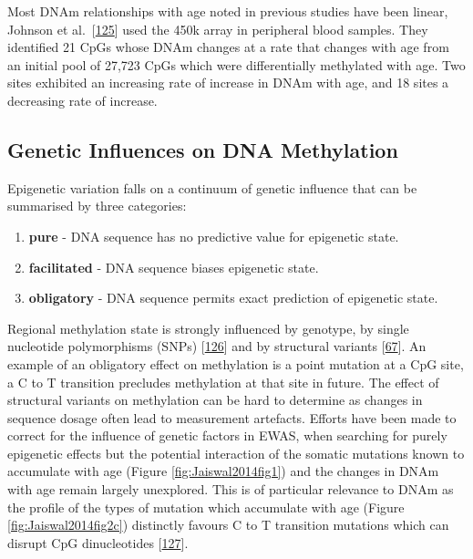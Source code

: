 \documentclass[
]{book}
\begin{document}
Most DNAm relationships with age noted in previous studies have been linear, Johnson et al.~{[}\protect\hyperlink{ref-Johnson2017}{125}{]} used the 450k array in peripheral blood samples.
They identified 21 CpGs whose DNAm changes at a rate that changes with age from an initial pool of 27,723 CpGs which were differentially methylated with age.
Two sites exhibited an increasing rate of increase in DNAm with age, and 18 sites a decreasing rate of increase.

\hypertarget{genetic-influences-on-dna-methylation}{%
\subsection{Genetic Influences on DNA Methylation}\label{genetic-influences-on-dna-methylation}}

Epigenetic variation falls on a continuum of genetic influence that can be summarised by three categories:

\begin{enumerate}
\def\labelenumi{\arabic{enumi}.}
\item
  \textbf{pure} - DNA sequence has no predictive value for epigenetic state.
\item
  \textbf{facilitated} - DNA sequence biases epigenetic state.
\item
  \textbf{obligatory} - DNA sequence permits exact prediction of epigenetic state.
\end{enumerate}

Regional methylation state is strongly influenced by genotype, by single nucleotide polymorphisms (SNPs) {[}\protect\hyperlink{ref-Smith2014a}{126}{]} and by structural variants {[}\protect\hyperlink{ref-Bell2017a}{67}{]}.
An example of an obligatory effect on methylation is a point mutation at a CpG site, a C to T transition precludes methylation at that site in future.
The effect of structural variants on methylation can be hard to determine as changes in sequence dosage often lead to measurement artefacts.
Efforts have been made to correct for the influence of genetic factors in EWAS, when searching for purely epigenetic effects but the potential interaction of the somatic mutations known to accumulate with age (Figure \ref{fig:Jaiswal2014fig1}) and the changes in DNAm with age remain largely unexplored.
This is of particular relevance to DNAm as the profile of the types of mutation which accumulate with age (Figure \ref{fig:Jaiswal2014fig2c}) distinctly favours C to T transition mutations which can disrupt CpG dinucleotides {[}\protect\hyperlink{ref-Jaiswal2014c}{127}{]}.
\end{document}
